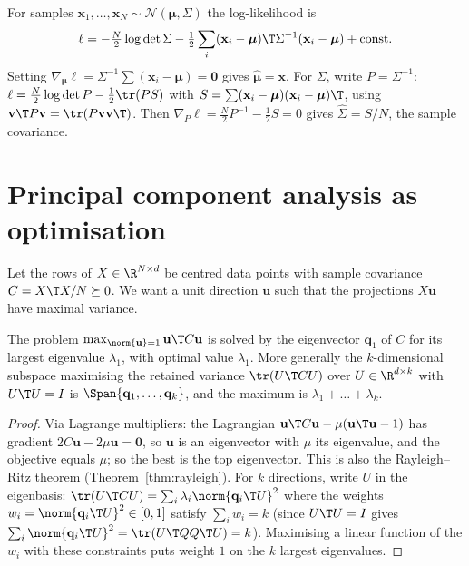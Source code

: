 \begin{example}
For samples $\mathbf{x}_1,\dots,\mathbf{x}_N\sim\mathcal{N}(\boldsymbol{\mu},\Sigma)$ the log-likelihood is
\[ \ell=-\tfrac N2\log\det\Sigma-\tfrac12\sum_i(\mathbf{x}_i-\boldsymbol{\mu})\T\Sigma^{-1}(\mathbf{x}_i-\boldsymbol{\mu})+\text{const}. \]
Setting $\nabla_{\boldsymbol\mu}\ell=\Sigma^{-1}\sum(\mathbf{x}_i-\boldsymbol\mu)=\mathbf{0}$ gives $\hat{\boldsymbol\mu}=\bar{\mathbf{x}}$. For $\Sigma$, write $P=\Sigma^{-1}$: $\ell=\tfrac N2\log\det P-\tfrac12\tr(PS)$ with $S=\sum(\mathbf{x}_i-\boldsymbol\mu)(\mathbf{x}_i-\boldsymbol\mu)\T$, using $\mathbf{v}\T P\mathbf{v}=\tr(P\mathbf{v}\mathbf{v}\T)$. Then $\nabla_P\ell=\tfrac N2P^{-1}-\tfrac12S=0$ gives $\hat\Sigma=S/N$, the sample covariance.
\end{example}

\section{Principal component analysis as optimisation}

Let the rows of $X\in\R^{N\times d}$ be centred data points with sample covariance $C=X\T X/N\succeq0$. We want a unit direction $\mathbf{u}$ such that the projections $X\mathbf{u}$ have maximal variance.

\begin{theorem}[PCA]\label{thm:pcaopt}
The problem $\max_{\norm{\mathbf{u}}=1}\mathbf{u}\T C\mathbf{u}$ is solved by the eigenvector $\mathbf{q}_1$ of $C$ for its largest eigenvalue $\lambda_1$, with optimal value $\lambda_1$. More generally the $k$-dimensional subspace maximising the retained variance $\tr(U\T CU)$ over $U\in\R^{d\times k}$ with $U\T U=I$ is $\Span\{\mathbf{q}_1,\dots,\mathbf{q}_k\}$, and the maximum is $\lambda_1+\dots+\lambda_k$.
\end{theorem}

\begin{proof}
Via Lagrange multipliers: the Lagrangian $\mathbf{u}\T C\mathbf{u}-\mu(\mathbf{u}\T\mathbf{u}-1)$ has gradient $2C\mathbf{u}-2\mu\mathbf{u}=\mathbf{0}$, so $\mathbf{u}$ is an eigenvector with $\mu$ its eigenvalue, and the objective equals $\mu$; so the best is the top eigenvector. This is also the Rayleigh--Ritz theorem (Theorem~\ref{thm:rayleigh}). For $k$ directions, write $U$ in the eigenbasis: $\tr(U\T CU)=\sum_i\lambda_i\norm{\mathbf{q}_i\T U}^2$ where the weights $w_i=\norm{\mathbf{q}_i\T U}^2\in[0,1]$ satisfy $\sum_iw_i=k$ (since $U\T U=I$ gives $\sum_i\norm{\mathbf{q}_i\T U}^2=\tr(U\T QQ\T U)=k$). Maximising a linear function of the $w_i$ with these constraints puts weight $1$ on the $k$ largest eigenvalues.
\end{proof}

